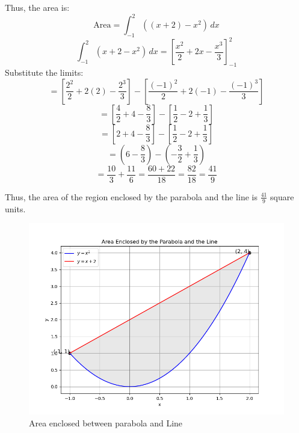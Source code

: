 \documentclass[journal]{IEEEtran}
\begin{document}
Thus, the area is:
\begin{equation}
\text{Area} = \int_{-1}^{2} \left( (x + 2) - x^2 \right) \, dx
\end{equation}
\begin{equation}
\int_{-1}^{2} \left( x + 2 - x^2 \right) \, dx = \left[ \frac{x^2}{2} + 2x - \frac{x^3}{3} \right]_{-1}^{2}
\end{equation}
Substitute the limits:
\begin{equation}
= \left[ \frac{2^2}{2} + 2(2) - \frac{2^3}{3} \right] - \left[ \frac{(-1)^2}{2} + 2(-1) - \frac{(-1)^3}{3} \right]
\end{equation}
\begin{equation}
= \left[ \frac{4}{2} + 4 - \frac{8}{3} \right] - \left[ \frac{1}{2} - 2 + \frac{1}{3} \right]
\end{equation}
\begin{equation}
= \left[ 2 + 4 - \frac{8}{3} \right] - \left[ \frac{1}{2} - 2 + \frac{1}{3} \right]
\end{equation}
\begin{equation}
= \left( 6 - \frac{8}{3} \right) - \left( -\frac{3}{2} + \frac{1}{3} \right)
\end{equation}
\begin{equation}
= \frac{10}{3} + \frac{11}{6} = \frac{60 + 22}{18} = \frac{82}{18} = \frac{41}{9}
\end{equation}

Thus, the area of the region enclosed by the parabola and the line is $\frac{41}{9}$ square units.
\begin{figure}[h!]
	\centering
	\includegraphics[width=0.5\linewidth]{figs/Figure_1.png}
	\caption{Area enclosed between parabola and Line}
	\label{stemplot}
\end{figure}	
\end{document}
